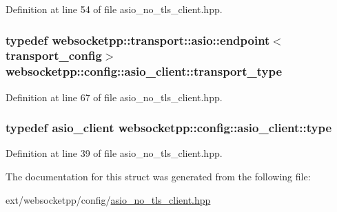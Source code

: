 Definition at line 54 of file asio\+\_\+no\+\_\+tls\+\_\+client.\+hpp.

\hypertarget{structwebsocketpp_1_1config_1_1asio__client_a0995b7dc42e350f8caa99b409b2cb0a7}{}
\subsubsection[{transport\+\_\+type}]{\setlength{\rightskip}{0pt plus 5cm}typedef {\bf websocketpp\+::transport\+::asio\+::endpoint}$<${\bf transport\+\_\+config}$>$ {\bf websocketpp\+::config\+::asio\+\_\+client\+::transport\+\_\+type}}\label{structwebsocketpp_1_1config_1_1asio__client_a0995b7dc42e350f8caa99b409b2cb0a7}


Definition at line 67 of file asio\+\_\+no\+\_\+tls\+\_\+client.\+hpp.

\hypertarget{structwebsocketpp_1_1config_1_1asio__client_a83c2101418dca5389a5d6a6af7351f36}{}
\subsubsection[{type}]{\setlength{\rightskip}{0pt plus 5cm}typedef {\bf asio\+\_\+client} {\bf websocketpp\+::config\+::asio\+\_\+client\+::type}}\label{structwebsocketpp_1_1config_1_1asio__client_a83c2101418dca5389a5d6a6af7351f36}


Definition at line 39 of file asio\+\_\+no\+\_\+tls\+\_\+client.\+hpp.



The documentation for this struct was generated from the following file\+:\begin{DoxyCompactItemize}
\item 
ext/websocketpp/config/\hyperlink{asio__no__tls__client_8hpp}{asio\+\_\+no\+\_\+tls\+\_\+client.\+hpp}\end{DoxyCompactItemize}
